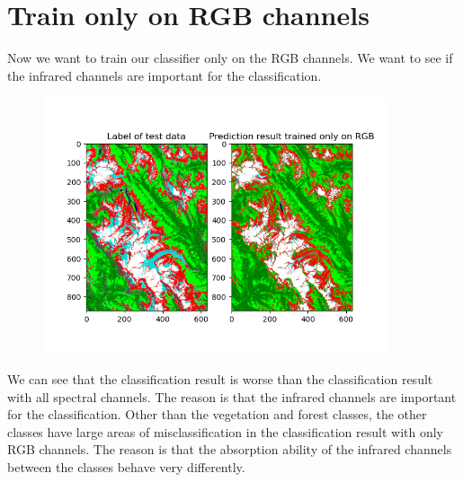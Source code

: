 \documentclass[12pt
,headinclude
,headsepline
,bibtotocnumbered
]{scrartcl}
\begin{document}
\section*{Train only on RGB channels}
Now we want to train our classifier only on the RGB channels. We want to see if the infrared channels are important for the classification.
\begin{figure}[H]
\centering
\includegraphics[width=0.9\textwidth]{plots/test_result_rgb.png}
\end{figure}
We can see that the classification result is worse than the classification result with all spectral channels. The reason is that the infrared channels are important for the classification. Other than the vegetation and forest classes, the other classes have large areas of misclassification in the classification result with only RGB channels. The reason is that the absorption ability of the infrared channels between the classes behave very differently.
\end{document}

